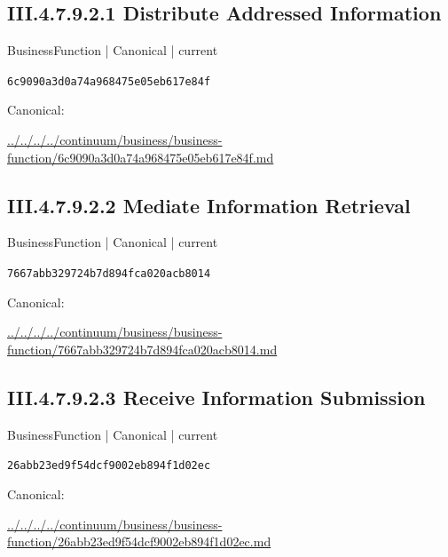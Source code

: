 \documentclass[10pt,a4paper]{article}
\begin{document}
\subsection*{III.4.7.9.2.1 Distribute Addressed Information}
\label{element-6c9090a3d0a74a968475e05eb617e84f}
{\small BusinessFunction | Canonical | current}\par
\texttt{6c9090a3d0a74a968475e05eb617e84f}\par
Canonical: \par
{\footnotesize\url{../../../../continuum/business/business-function/6c9090a3d0a74a968475e05eb617e84f.md}}\par
\subsection*{III.4.7.9.2.2 Mediate Information Retrieval}
\label{element-7667abb329724b7d894fca020acb8014}
{\small BusinessFunction | Canonical | current}\par
\texttt{7667abb329724b7d894fca020acb8014}\par
Canonical: \par
{\footnotesize\url{../../../../continuum/business/business-function/7667abb329724b7d894fca020acb8014.md}}\par
\subsection*{III.4.7.9.2.3 Receive Information Submission}
\label{element-26abb23ed9f54dcf9002eb894f1d02ec}
{\small BusinessFunction | Canonical | current}\par
\texttt{26abb23ed9f54dcf9002eb894f1d02ec}\par
Canonical: \par
{\footnotesize\url{../../../../continuum/business/business-function/26abb23ed9f54dcf9002eb894f1d02ec.md}}\par
\end{document}
